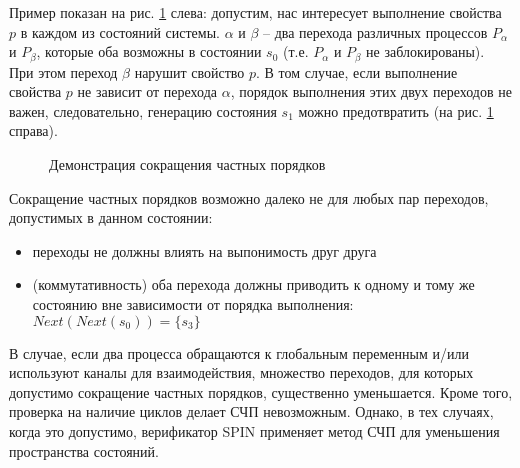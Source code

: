 Пример показан на рис. \ref{fig:partial-order-reduction} слева:
допустим, нас интересует выполнение свойства $p$ в каждом из состояний
системы. $\alpha$ и $\beta$ -- два перехода различных процессов
$P_{\alpha}$ и $P_{\beta}$, которые оба возможны в состоянии $s_0$
(т.е. $P_{\alpha}$ и $P_{\beta}$ не заблокированы). При этом переход
$\beta$ нарушит свойство $p$. В том случае, если выполнение свойства
$p$ не зависит от перехода $\alpha$, порядок выполнения этих двух
переходов не важен, следовательно, генерацию состояния $s_1$ можно
предотвратить (на рис. \ref{fig:partial-order-reduction} справа).

\begin{figure}[ht]
  \centering
  
  \caption{Демонстрация сокращения частных порядков}
  \label{fig:partial-order-reduction}
\end{figure}

Сокращение частных порядков возможно далеко не для любых пар
переходов, допустимых в данном состоянии:

\begin{itemize}
\item переходы не должны влиять на выпонимость друг друга
\item (коммутативность) оба перехода должны приводить к одному и тому же состоянию
  вне зависимости от порядка выполнения: $Next(Next(s_0)) = \{ s_3 \}$
\end{itemize}

В случае, если два процесса обращаются к глобальным переменным и/или
используют каналы для взаимодействия, множество переходов, для которых
допустимо сокращение частных порядков, существенно уменьшается. Кроме
того, проверка на наличие циклов делает СЧП невозможным. Однако, в тех
случаях, когда это допустимо, верификатор SPIN применяет метод СЧП для
уменьшения пространства состояний.


